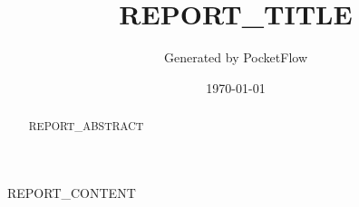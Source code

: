 \documentclass[11pt,a4paper]{article}
\begin{document}
\title{REPORT_TITLE}
\author{Generated by PocketFlow}
\date{\today}

\maketitle

\begin{abstract}
REPORT_ABSTRACT
\end{abstract}

\tableofcontents
\newpage

REPORT_CONTENT
\end{document}
